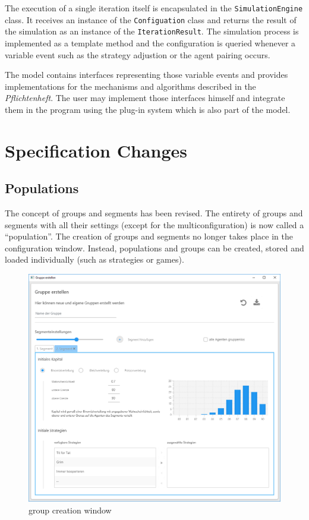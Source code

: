 \documentclass[parskip=full,11pt]{scrartcl}
\begin{document}
The execution of a single iteration itself is encapsulated in the \texttt{SimulationEngine} class. It receives an instance of the \texttt{Configuation} class and returns the result of the simulation as an instance of the \texttt{IterationResult}. The simulation process is implemented as a template method and the configuration is queried whenever a variable event such as the strategy adjustion or the agent pairing occurs.

The model contains interfaces representing those variable events and provides implementations for the mechanisms and algorithms described in the \textit{Pflichtenheft}. The user may implement those interfaces himself and integrate them in the program using the plug-in system which is also part of the model.

\section{Specification Changes}

\subsection{Populations}
The concept of groups and segments has been revised. The entirety of groups and segments with all their settings (except for the multiconfiguration) is now called a \enquote{population}. The creation of groups and segments no longer takes place in the configuration window. Instead, populations and groups can be created, stored and loaded individually (such as strategies or games).

\begin{figure}[h]
	\centering
	\includegraphics[width = \linewidth]{images/group_window.png}
	\caption{group creation window}
	\label{fig:group_creation}
\end{figure}
\end{document}
